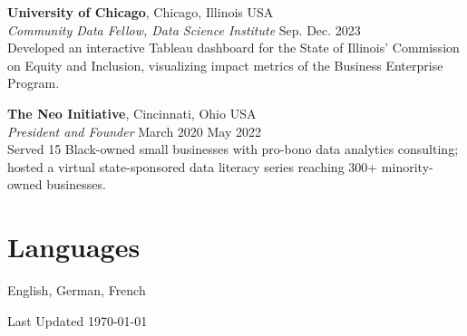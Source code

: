 \documentclass[margin,line]{res}
\begin{document}
\begin{resume}
\textbf{University of Chicago}, Chicago, Illinois USA \\
\textit{Community Data Fellow, Data Science Institute} \hfill Sep.{ \textemdash } Dec. 2023 \\
Developed an interactive Tableau dashboard for the State of Illinois' Commission on Equity and Inclusion, visualizing impact metrics of the Business Enterprise Program.

\vspace{4pt}

\textbf{The Neo Initiative}, Cincinnati, Ohio USA \\
\textit{President and Founder} \hfill March 2020{ \textemdash } May 2022 \\
Served 15 Black-owned small businesses with pro-bono data analytics consulting; hosted a virtual state-sponsored data literacy series reaching 300+ minority-owned businesses.

\section{\sc Languages}

English, German, French

\end{resume}

\begin{center}
  \vfill
  Last Updated \today
\end{center}
\end{document}
